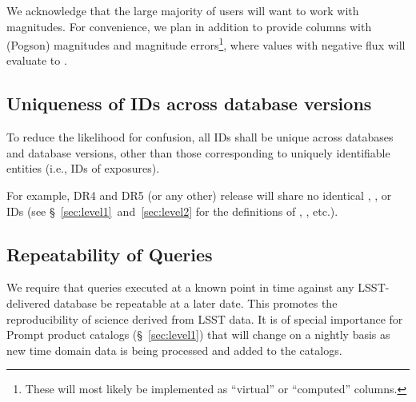 \documentclass[SE,lsstdraft,toc]{lsstdoc}
\begin{document}
We acknowledge that the large majority of users will want to work with magnitudes. For convenience, we plan
in addition
to provide columns with (Pogson) magnitudes and magnitude errors\footnote{These will most likely be implemented as ``virtual'' or ``computed'' columns.}, where values with negative flux will evaluate to .

\subsection{Uniqueness of IDs across database versions}

To reduce the likelihood for confusion, all IDs shall be unique across databases and database versions, other than those corresponding to uniquely identifiable entities (i.e., IDs of exposures).

For example, DR4 and DR5 (or any other) release will share no identical \Object, \Source, \DIAObject or \DIASource IDs (see \S~\ref{sec:level1}~and~\ref{sec:level2} for the definitions of \Objects, \DIAObjects, etc.).

\subsection{Repeatability of Queries}
\label{sec:repeatability}

We require that queries executed at a known point in time against any LSST-delivered database be repeatable at a later date. This promotes the reproducibility of science derived from LSST data. It is of special importance for Prompt product catalogs (\S~\ref{sec:level1}) that will change on a nightly basis as new time domain data is being processed and added to the catalogs.
\end{document}
